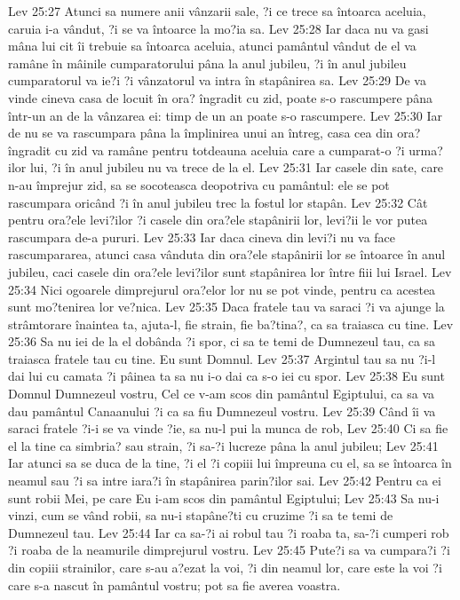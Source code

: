 Lev 25:27  Atunci sa numere anii vânzarii sale, ?i ce trece sa întoarca aceluia, caruia i-a vândut, ?i se va întoarce la mo?ia sa.
Lev 25:28  Iar daca nu va gasi mâna lui cit îi trebuie sa întoarca aceluia, atunci pamântul vândut de el va ramâne în mâinile cumparatorului pâna la anul jubileu, ?i în anul jubileu cumparatorul va ie?i ?i vânzatorul va intra în stapânirea sa.
Lev 25:29  De va vinde cineva casa de locuit în ora? îngradit cu zid, poate s-o rascumpere pâna într-un an de la vânzarea ei: timp de un an poate s-o rascumpere.
Lev 25:30  Iar de nu se va rascumpara pâna la împlinirea unui an întreg, casa cea din ora? îngradit cu zid va ramâne pentru totdeauna aceluia care a cumparat-o ?i urma?ilor lui, ?i în anul jubileu nu va trece de la el.
Lev 25:31  Iar casele din sate, care n-au împrejur zid, sa se socoteasca deopotriva cu pamântul: ele se pot rascumpara oricând ?i în anul jubileu trec la fostul lor stapân.
Lev 25:32  Cât pentru ora?ele levi?ilor ?i casele din ora?ele stapânirii lor, levi?ii le vor putea rascumpara de-a pururi.
Lev 25:33  Iar daca cineva din levi?i nu va face rascumpararea, atunci casa vânduta din ora?ele stapânirii lor se întoarce în anul jubileu, caci casele din ora?ele levi?ilor sunt stapânirea lor între fiii lui Israel.
Lev 25:34  Nici ogoarele dimprejurul ora?elor lor nu se pot vinde, pentru ca acestea sunt mo?tenirea lor ve?nica.
Lev 25:35  Daca fratele tau va saraci ?i va ajunge la strâmtorare înaintea ta, ajuta-l, fie strain, fie ba?tina?, ca sa traiasca cu tine.
Lev 25:36  Sa nu iei de la el dobânda ?i spor, ci sa te temi de Dumnezeul tau, ca sa traiasca fratele tau cu tine. Eu sunt Domnul.
Lev 25:37  Argintul tau sa nu ?i-l dai lui cu camata ?i pâinea ta sa nu i-o dai ca s-o iei cu spor.
Lev 25:38  Eu sunt Domnul Dumnezeul vostru, Cel ce v-am scos din pamântul Egiptului, ca sa va dau pamântul Canaanului ?i ca sa fiu Dumnezeul vostru.
Lev 25:39  Când îi va saraci fratele ?i-i se va vinde ?ie, sa nu-l pui la munca de rob,
Lev 25:40  Ci sa fie el la tine ca simbria? sau strain, ?i sa-?i lucreze pâna la anul jubileu;
Lev 25:41  Iar atunci sa se duca de la tine, ?i el ?i copiii lui împreuna cu el, sa se întoarca în neamul sau ?i sa intre iara?i în stapânirea parin?ilor sai.
Lev 25:42  Pentru ca ei sunt robii Mei, pe care Eu i-am scos din pamântul Egiptului;
Lev 25:43  Sa nu-i vinzi, cum se vând robii, sa nu-i stapâne?ti cu cruzime ?i sa te temi de Dumnezeul tau.
Lev 25:44  Iar ca sa-?i ai robul tau ?i roaba ta, sa-?i cumperi rob ?i roaba de la neamurile dimprejurul vostru.
Lev 25:45  Pute?i sa va cumpara?i ?i din copiii strainilor, care s-au a?ezat la voi, ?i din neamul lor, care este la voi ?i care s-a nascut în pamântul vostru; pot sa fie averea voastra.
